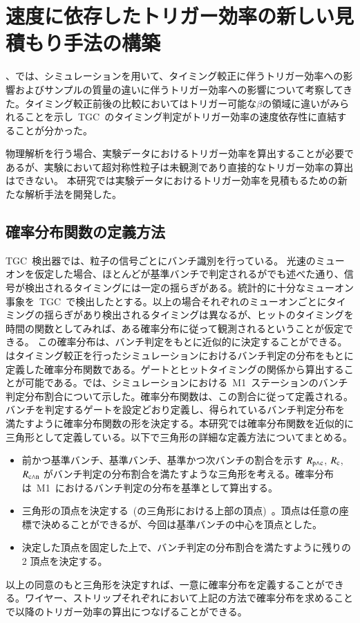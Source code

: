 \section{速度に依存したトリガー効率の新しい見積もり手法の構築}\label{sec:est}
、では、シミュレーションを用いて、タイミング較正に伴うトリガー効率への影響およびサンプルの質量の違いに伴うトリガー効率への影響について考察してきた。タイミング較正前後の比較においてはトリガー可能な$\beta$の領域に違いがみられることを示し~TGC~のタイミング判定がトリガー効率の速度依存性に直結することが分かった。

物理解析を行う場合、実験データにおけるトリガー効率を算出することが必要であるが、実験において超対称性粒子は未観測であり直接的なトリガー効率の算出はできない。
本研究では実験データにおけるトリガー効率を見積もるための新たな解析手法を開発した。

\subsection{確率分布関数の定義方法}\label{sec:pro}
TGC~検出器では、粒子の信号ごとにバンチ識別を行っている。
光速のミューオンを仮定した場合、ほとんどが基準バンチで判定されるがでも述べた通り、信号が検出されるタイミングには一定の揺らぎがある。統計的に十分なミューオン事象を~TGC~で検出したとする。以上の場合それぞれのミューオンごとにタイミングの揺らぎがあり検出されるタイミングは異なるが、ヒットのタイミングを時間の関数としてみれば、ある確率分布に従って観測されるということが仮定できる。
この確率分布は、バンチ判定をもとに近似的に決定することができる。はタイミング較正を行ったシミュレーションにおけるバンチ判定の分布をもとに定義した確率分布関数である。ゲートとヒットタイミングの関係から算出することが可能である。では、シミュレーションにおける~M1~ステーションのバンチ判定分布割合について示した。確率分布関数は、この割合に従って定義される。バンチを判定するゲートを設定どおり定義し、得られているバンチ判定分布を満たすように確率分布関数の形を決定する。本研究では確率分布関数を近似的に三角形として定義している。以下で三角形の詳細な定義方法についてまとめる。
\begin{itemize}
\item 前かつ基準バンチ、基準バンチ、基準かつ次バンチの割合を示す $\it{R}_{\rm{p{\land}c}}$, $\it{R}_{\rm{c}}$, $\it{R}_{\rm{c{\land}n}}$ がバンチ判定の分布割合を満たすような三角形を考える。確率分布は~M1~におけるバンチ判定の分布を基準として算出する。
\item 三角形の頂点を決定する~(の三角形における上部の頂点)~。頂点は任意の座標で決めることができるが、今回は基準バンチの中心を頂点とした。
\item 決定した頂点を固定した上で、バンチ判定の分布割合を満たすように残りの 2 頂点を決定する。
\end{itemize}
以上の同意のもと三角形を決定すれば、一意に確率分布を定義することができる。ワイヤー、ストリップそれぞれにおいて上記の方法で確率分布を求めることで以降のトリガー効率の算出につなげることができる。

